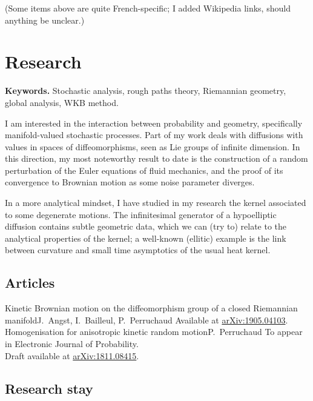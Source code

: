 \documentclass[11pt,classic]{moderncv}
\begin{document}
\smallskip

{\small(Some items above are quite French-specific; I added Wikipedia links, should anything be unclear.)}

\section{Research}

\textbf{Keywords.} Stochastic analysis, rough paths theory, Riemannian geometry, global analysis, WKB method.

\medskip

I am interested in the interaction between probability and geometry, specifically manifold-valued stochastic processes. Part of my work deals with diffusions with values in spaces of diffeomorphisms, seen as Lie groups of infinite dimension. In this direction, my most noteworthy result to date is the construction of a random perturbation of the Euler equations of fluid mechanics, and the proof of its convergence to Brownian motion as some noise parameter diverges.

\smallskip

In a more analytical mindset, I have studied in my research the kernel associated to some degenerate motions. The infinitesimal generator of a hypoelliptic diffusion contains subtle geometric data, which we can (try to) relate to the analytical properties of the kernel; a well-known (ellitic) example is the link between curvature and small time asymptotics of the usual heat kernel.

\subsection{Articles}
   {Kinetic Brownian motion on the diffeomorphism group of a closed Riemannian manifold}{J.~Angst, I.~Bailleul, P.~Perruchaud}{}{}
   {Available at \href{https://arxiv.org/abs/1905.04103}{arXiv:1905.04103}.}
   {Homogenisation for anisotropic kinetic random motion}{P.~Perruchaud}{}{}
   {To appear in Electronic Journal of Probability.\\Draft available at \href{https://arxiv.org/abs/1811.08415}{arXiv:1811.08415}.}

\subsection{Research stay}

\end{document}
